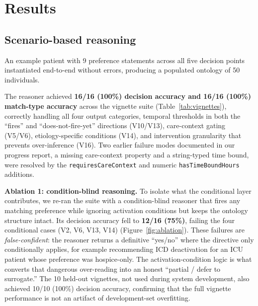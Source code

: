 \documentclass[10pt]{article}
\newcommand{\onto}[1]{\texttt{\small #1}}
\begin{document}
\section{Results}

\subsection{Scenario-based reasoning}
An example patient with 9 preference statements across all five decision points instantiated end-to-end without errors, producing a populated ontology of 50 individuals.

The reasoner achieved \textbf{16/16 (100\%) decision accuracy and 16/16 (100\%) match-type accuracy} across the vignette suite (Table~\ref{tab:vignettes}), correctly handling all four output categories, temporal thresholds in both the ``fires'' and ``does-not-fire-yet'' directions (V10/V13), care-context gating (V5/V6), etiology-specific conditions (V14), and intervention granularity that prevents over-inference (V16). Two earlier failure modes documented in our progress report, a missing care-context property and a string-typed time bound, were resolved by the \onto{requiresCareContext} and numeric \onto{hasTimeBoundHours} additions.

\textbf{Ablation 1: condition-blind reasoning.} To isolate what the conditional layer contributes, we re-ran the suite with a condition-blind reasoner that fires any matching preference while ignoring activation conditions but keeps the ontology structure intact. Its decision accuracy fell to \textbf{12/16 (75\%)}, failing the four conditional cases (V2, V6, V13, V14) (Figure~\ref{fig:ablation}). These failures are \emph{false-confident}: the reasoner returns a definitive ``yes/no'' where the directive only conditionally applies, for example recommending ICD deactivation for an ICU patient whose preference was hospice-only. The activation-condition logic is what converts that dangerous over-reading into an honest ``partial / defer to surrogate.'' The 10 held-out vignettes, not used during system development, also achieved 10/10 (100\%) decision accuracy, confirming that the full vignette performance is not an artifact of development-set overfitting.
\end{document}
